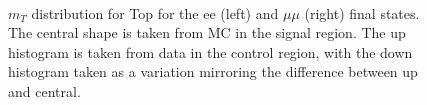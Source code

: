\begin{figure}[!htbp]
\begin{center}
\\
\caption{$m_T$ distribution for Top for the ee (left) and $\mu\mu$ (right) final states. 
The central shape is taken from MC in the signal region. The up histogram is taken from 
data in the control region, with the down 
histogram taken as a variation mirroring the difference between up and central. 
}
\label{fig:topsyst_hzz}
\end{center}
\end{figure}

